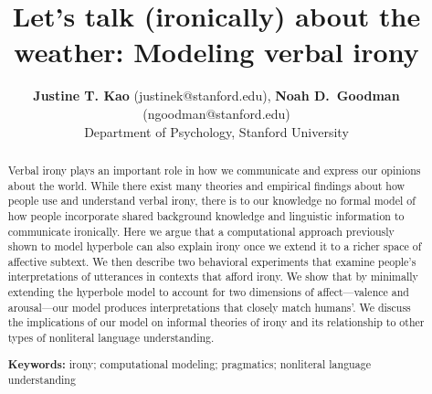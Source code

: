 \documentclass[10pt,letterpaper]{article}
\title{Let's talk (ironically) about the weather: Modeling verbal irony}
\author{{\large {\bf Justine T. Kao} (justinek@stanford.edu)}, {\large {\bf Noah D.~Goodman} (ngoodman@stanford.edu)}\\
  Department of Psychology, Stanford University}
\begin{document}
\maketitle


\begin{abstract}
Verbal irony plays an important role in how we communicate and express our opinions about the world. While there exist many theories and empirical findings about how people use and understand verbal irony, there is to our knowledge no formal model of how people incorporate shared background knowledge and linguistic information to communicate ironically. Here we argue that a computational approach previously shown to model hyperbole \cite{kao2014nonliteral} can also explain irony once we extend it to a richer space of affective subtext. We then describe two behavioral experiments that examine people's interpretations of utterances in contexts that afford irony. We show that by minimally extending the hyperbole model to account for two dimensions of affect---valence and arousal---our model produces interpretations that closely match humans'. We discuss the implications of our model on informal theories of irony and its relationship to other types of nonliteral language understanding.


\textbf{Keywords:} 
irony; computational modeling; pragmatics; nonliteral language understanding
\end{abstract}
\end{document}
